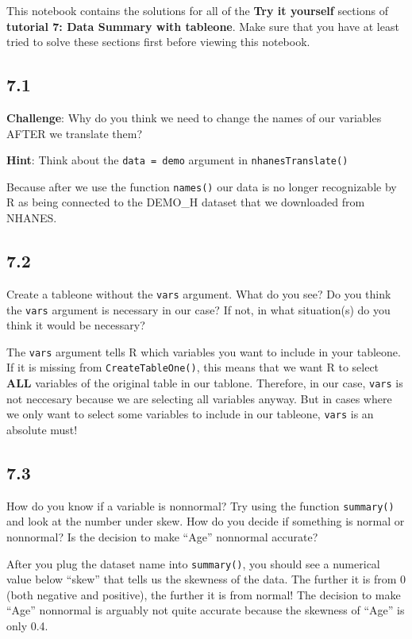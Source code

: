 \documentclass[
]{book}
\begin{document}
This notebook contains the solutions for all of the \textbf{Try it yourself} sections of \textbf{tutorial 7: Data Summary with tableone}. Make sure that you have at least tried to solve these sections first before viewing this notebook.

\hypertarget{section-38}{%
\subsection{7.1}\label{section-38}}

\textbf{Challenge}: Why do you think we need to change the names of our variables AFTER we translate them?

\textbf{Hint}: Think about the \texttt{data\ =\ demo} argument in \texttt{nhanesTranslate()}

Because after we use the function \texttt{names()} our data is no longer recognizable by R as being connected to the DEMO\_H dataset that we downloaded from NHANES.

\hypertarget{section-39}{%
\subsection{7.2}\label{section-39}}

Create a tableone without the \texttt{vars} argument. What do you see?
Do you think the \texttt{vars} argument is necessary in our case? If not, in what situation(s) do you think it would be necessary?

The \texttt{vars} argument tells R which variables you want to include in your tableone. If it is missing from \texttt{CreateTableOne()}, this means that we want R to select \textbf{ALL} variables of the original table in our tablone. Therefore, in our case, \texttt{vars} is not neccesary because we are selecting all variables anyway. But in cases where we only want to select some variables to include in our tableone, \texttt{vars} is an absolute must!

\hypertarget{section-40}{%
\subsection{7.3}\label{section-40}}

How do you know if a variable is nonnormal? Try using the function \texttt{summary()} and look at the number under skew. How do you decide if something is normal or nonnormal? Is the decision to make ``Age'' nonnormal accurate?

After you plug the dataset name into \texttt{summary()}, you should see a numerical value below ``skew'' that tells us the skewness of the data. The further it is from 0 (both negative and positive), the further it is from normal! The decision to make ``Age'' nonnormal is arguably not quite accurate because the skewness of ``Age'' is only 0.4.
\end{document}

